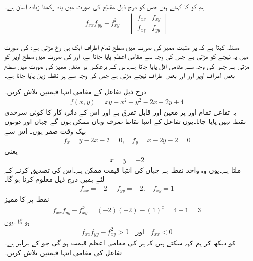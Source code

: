 ہم  کو  کا     کہتے ہیں جس کو درج ذیل مقطع کی  صورت میں  یاد رکھنا زیادہ آسان ہے۔
\begin{align*}
f_{xx}f_{yy}-f_{xy}^2=\begin{vmatrix}f_{xx}&f_{xy}\\ f_{xy}&f_{yy} \end{vmatrix}
\end{align*}

مسئلہ  کہتا ہے کہ  پر  مثبت ممیز کی صورت میں  سطح تمام اطراف ایک ہی رخ مڑتی ہے:   کی صورت میں یہ نیچے کو مڑتی ہے جس کی وجہ سے مقامی اعظم  پایا جاتا ہے، اور  کی صورت میں سطح اوپر کو مڑتی ہے جس کی وجہ سے  مقامی  اقل پایا جاتا ہے۔اس کے برعکس  پر منفی ممیز کی صورت میں  سطح بعض اطراف اوپر اور اور بعض اطراف    نیچے مڑتی ہے جس کی وجہ سے    پر نقطہ زین پایا جاتا ہے۔

درج ذیل تفاعل کے مقامی انتہا قیمتیں تلاش کریں۔
\begin{align*}
f(x,y)=xy-x^2-y^2-2x-2y+4
\end{align*}
یہ تفاعل تمام  اور   پر معین اور قابل تفرق ہے اور  اس  کے دائرہ کار کا کوئی سرحدی نقطہ نہیں پایا جاتا۔یوں  تفاعل کے انتہا نقاط صرف وہاں    ممکن ہوں گے  جہاں  اور  دونوں بیک وقت  صفر ہوں۔ اس سے
\begin{align*}
f_x=y-2x-2=0,\quad f_y=x-2y-2=0
\end{align*}
یعنی
\begin{align*}
x=y=-2
\end{align*}
ملتا ہے۔یوں   وہ واحد نقطہ ہے جہاں  کی انتہا قیمت ممکن ہے۔اس کی تصدیق کرنے کے لئے ہمیں درج ذیل معلوم کرنا ہو گا۔
\begin{align*}
f_{xx}=-2,\quad f_{yy}=-2,\quad f_{xy}=1
\end{align*}
نقطہ  پر  کا ممیز
\begin{align*}
f_{xx}f_{yy}-f_{xy}^2=(-2)(-2)-(1)^2=4-1=3
\end{align*}
ہو گا ۔یوں
\begin{align*}
f_{xx}f_{yy}-f_{xy}^2>0\quad\text{اور}\quad f_{xx}<0
\end{align*}
کو دیکھ کر ہم کہہ سکتے ہیں کہ  پر  کی  مقامی اعظم قیمت ہو گی جو    کے برابر ہے۔
تفاعل  کی مقامی انتہا قیمتیں تلاش کریں۔

